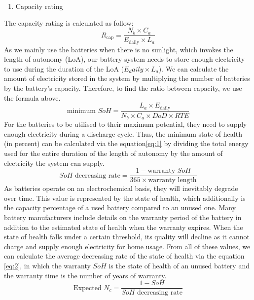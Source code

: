 \begin{enumerate}[resume]
    \item Capacity rating
\end{enumerate}
The capacity rating is calculated as follow:
\begin{equation}
    R_\text{cap} = \frac{N_b \times C_a}{E_\text{daily} \times L_a} 
    \label{eq:0}
\end{equation}
As we mainly use the batteries when there is no sunlight, which invokes the length of autonomy (LoA), our battery system needs to store enough electricity to use during the duration of the LoA ($E_daily \times L_a$). We can calculate the amount of electricity stored in the system by multiplying the number of batteries by the battery's capacity. Therefore, to find the ratio between capacity, we use the formula above.
\begin{equation}
    \text{minimum } SoH = \frac{L_a \times E_\text{daily}}{N_b \times C_a \times DoD \times RTE}\label{eq:1}
\end{equation}
For the batteries to be utilised to their maximum potential, they need to supply enough electricity during a discharge cycle. Thus, the minimum state of health (in percent) can be calculated via the equation\eqref{eq:1} by dividing the total energy used for the entire duration of the length of autonomy by the amount of electricity the system can supply.
\begin{equation}
    SoH \text{ decreasing rate} = \frac{1 - \text{warranty } SoH}{365 \times \text{warranty length}}\label{eq:2}
\end{equation}
As batteries operate on an electrochemical basis, they will inevitably degrade over time. This value is represented by the state of health, which additionally is the capacity percentage of a used battery compared to an unused one. Many battery manufacturers include details on the warranty period of the battery in addition to the estimated state of health when the warranty expires. When the state of health falls under a certain threshold, its quality will decline as it cannot charge and supply enough electricity for home usage. From all of these values, we can calculate the average decreasing rate of the state of health via the equation \eqref{eq:2}, in which the warranty $SoH$ is the state of health of an unused battery and the warranty time is the number of years of warranty.
\begin{equation}
    \text{Expected }N_c = \frac{1 - SoH}{SoH \text{ decreasing rate}}\label{eq:3}
\end{equation}


